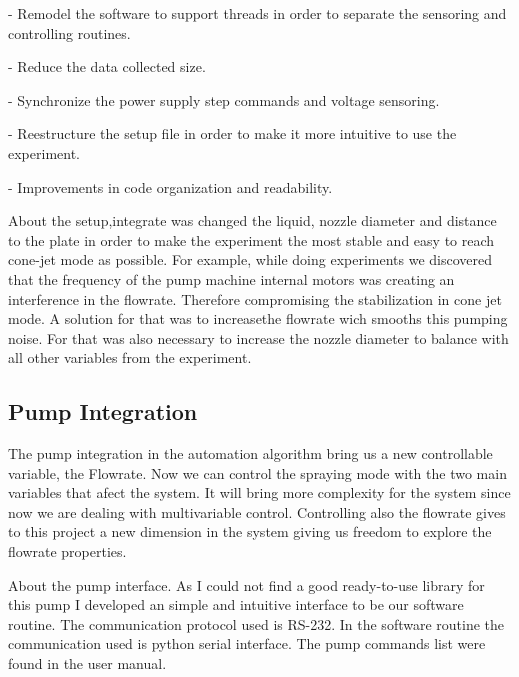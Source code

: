 - Remodel the software to support threads in order to separate the sensoring and controlling routines.

- Reduce the data collected size.

- Synchronize the power supply step commands and voltage sensoring.

- Reestructure the setup file in order to make it more intuitive to use the experiment.

- Improvements in code organization and readability.

About the setup,integrate was changed the liquid, nozzle diameter and distance to the plate in order to
make the experiment the most stable and easy to reach cone-jet mode as possible. For example, while doing experiments we discovered that the frequency of the pump machine internal motors was creating an interference in the flowrate. Therefore compromising the stabilization in cone jet mode. A solution for that was to increasethe flowrate wich smooths this pumping noise. For that was also necessary to increase the nozzle diameter to balance with all other variables from the experiment.

\subsection{Pump Integration}

    The pump integration in the automation algorithm bring us a new controllable variable, the Flowrate. Now we can control the spraying mode with the
    two main variables that afect the system. 
    It will bring more complexity for the system since now we are dealing with multivariable control.
    Controlling also the flowrate gives to this project a new dimension in the system giving us freedom to explore the flowrate properties.

    About the pump interface. As I could not find a good ready-to-use library for this pump I developed an simple and intuitive interface to be our software routine.
    The communication protocol used is RS-232. In the software routine the communication used is python serial interface. The pump commands list were found in the user manual.



\clearpage